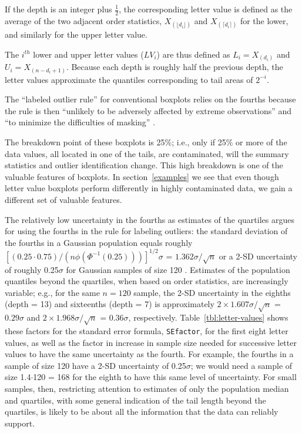 \documentclass[12pt,oneside]{article}
\begin{document}
If the depth is an integer plus $\frac{1}{2}$,  the corresponding letter value is defined as the average of the two adjacent order statistics, $X_{(\lfloor d_i \rfloor)}$ and $X_{(\lceil d_i \rceil)}$ for the lower, and similarly for the upper letter value.

The $i^{th}$ lower and upper letter values ($LV_i$) are thus defined as $L_i = X_{(d_i)}$ and $U_i = X_{(n - d_i + 1)}$. 
Because each depth is roughly half the previous depth, the letter values approximate the quantiles corresponding to tail areas of $2^{-i}$.

The ``labeled outlier rule'' for conventional boxplots relies on the fourths because the rule is then ``unlikely to be adversely affected by extreme observations'' and ``to minimize the difficulties of masking'' \citep[pg. 992]{dchbox}. 

The breakdown point of these boxplots is 25\%; i.e., only if 25\% or more of the data values, all located in one of the tails, are contaminated, will the summary statistics and outlier identification change. This high breakdown is one of the valuable features of boxplots. In section~\ref{examples} we see that even though  letter value boxplots  perform differently in highly contaminated data, we gain a different set of valuable features.

The relatively low uncertainty in the fourths as estimates of the quartiles argues for using the fourths in the rule for labeling outliers: the standard deviation of the fourths in a Gaussian population equals roughly $[(0.25 \cdot 0.75) / (n \phi(\Phi^{-1}(0.25)))]^{1/2} \sigma$ = $1.362 \sigma / \sqrt{n}$ or a 2-SD uncertainty of roughly 0.25$\sigma$ for Gaussian samples of size 120 \citep{ha.order}. Estimates of the population quantiles beyond the quartiles, when based on order statistics, are increasingly variable; e.g., for the same $n = 120$ sample, the 2-SD uncertainty in the eighths (depth = 13) and sixteenths (depth = 7) is approximately $ 2 \times 1.607 \sigma / \sqrt{n}$ = $0.29 \sigma$ and $ 2 \times 1.968 \sigma / \sqrt{n}$ = $0.36 \sigma$, respectively. Table~\ref{tbl:letter-values} shows these factors for the standard error formula, \texttt{SEfactor}, for the first eight letter values, as well as the factor in increase in sample size needed for successive letter values to have the same uncertainty as the fourth. 
For example, the fourths in a sample of size 120 have a 2-SD uncertainty of 0.25$\sigma$; we would need a sample of size 1.4$\cdot$120 = 168 for the eighth to have this same level of uncertainty.
For small samples, then, restricting attention to estimates of only the population median and quartiles, with some general indication of the tail length beyond the quartiles, is likely to be about all the information that the data can reliably support.
\end{document}
